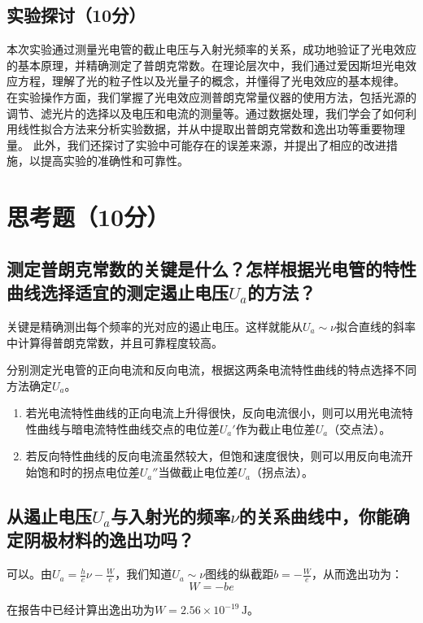 \documentclass[]{../../templates/Report}%
\begin{document}
\begin{fullreportonly}
\subsection{实验探讨（10分）}
本次实验通过测量光电管的截止电压与入射光频率的关系，成功地验证了光电效应的基本原理，并精确测定了普朗克常数。在理论层次中，我们通过爱因斯坦光电效应方程，理解了光的粒子性以及光量子的概念，并懂得了光电效应的基本规律。
在实验操作方面，我们掌握了光电效应测普朗克常量仪器的使用方法，包括光源的调节、滤光片的选择以及电压和电流的测量等。通过数据处理，我们学会了如何利用线性拟合方法来分析实验数据，并从中提取出普朗克常数和逸出功等重要物理量。
此外，我们还探讨了实验中可能存在的误差来源，并提出了相应的改进措施，以提高实验的准确性和可靠性。

\section{思考题（10分）}
\subsection{测定普朗克常数的关键是什么？怎样根据光电管的特性曲线选择适宜的测定遏止电压$U_a$的方法？}

关键是精确测出每个频率的光对应的遏止电压。这样就能从$U_a \sim \nu$拟合直线的斜率中计算得普朗克常数，并且可靠程度较高。

分别测定光电管的正向电流和反向电流，根据这两条电流特性曲线的特点选择不同方法确定$U_a$。
\begin{enumerate}
    \item 若光电流特性曲线的正向电流上升得很快，反向电流很小，则可以用光电流特性曲线与暗电流特性曲线交点的电位差$U_a'$作为截止电位差$U_a$（交点法）。
    \item 若反向特性曲线的反向电流虽然较大，但饱和速度很快，则可以用反向电流开始饱和时的拐点电位差$U_a''$当做截止电位差$U_a$（拐点法）。
\end{enumerate}

\subsection{从遏止电压$U_a$与入射光的频率$\nu$的关系曲线中，你能确定阴极材料的逸出功吗？}
可以。由$U_a = \frac{h}{e} \nu - \frac{W}{e}$，我们知道$U_a \sim \nu$图线的纵截距$b = - \frac{W}{e}$，从而逸出功为：
\begin{equation}
    W = -be
\end{equation}

在报告中已经计算出逸出功为$W=2.56 \times 10^{-19}\,\mathrm{J}$。


\end{fullreportonly}
\end{document}
